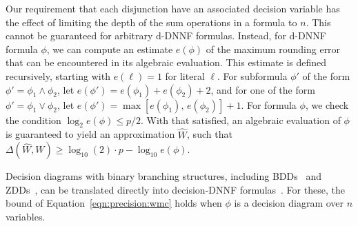 \documentclass[letterpaper,USenglish,cleveref, autoref, thm-restate]{lipics-v2021}
\newcommand{\lit}{\ell}
\newcommand{\approximate}[1]{\hat{#1}}
\newcommand{\approxW}{\approximate{W}}
\newcommand{\digitprecision}{\Delta}
\newcommand{\assign}{\alpha}
\begin{document}
Our requirement that each disjunction have an associated decision
variable has the effect of limiting the depth of the sum operations in
a formula to $n$.  This cannot be guaranteed for arbitrary d-DNNF formulas.
Instead, for d-DNNF formula $\phi$, we
can compute an estimate $e(\phi)$ of the maximum
rounding error that can be encountered in its algebraic evaluation.  This estimate is defined recursively, starting with
$e(\lit) = 1$ for literal $\ell$.
For subformula $\phi'$ of the form $\phi' = \phi_1 \land \phi_2$, let $e(\phi') = e(\phi_1) + e(\phi_2) + 2$,
and for one of the form $\phi' = \phi_1 \lor \phi_2$, let $e(\phi') = \max[e(\phi_1),\, e(\phi_2)] + 1$.
For formula $\phi$,
we check the condition $\log_2 e(\phi) \leq p/2$.  With that satisfied,
an algebraic evaluation of $\phi$ is guaranteed to yield an approximation $\approxW$, such that
$\digitprecision(\approxW, W) \geq \log_{10}(2)\cdot p - \log_{10}e(\phi)$.

Decision diagrams with binary branching structures, including
BDDs~\cite{knuth:bdd:2011} and ZDDs~\cite{minato:sttt:2001}, can be
translated directly into decision-DNNF formulas~\cite{oztok:cp:2014}.
For these, the bound of Equation~\ref{eqn:precision:wmc} holds when $\phi$ is a decision diagram over $n$ variables.
\end{document}
